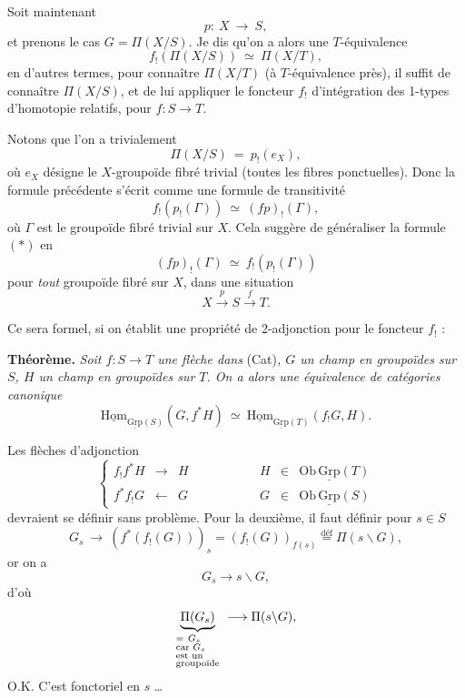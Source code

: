 \documentclass[11pt]{article}
\newcommand{\printedpage}[1]{\marginpar{\footnotesize p.~#1}}
\newcommand{\msp}[1]{\marginpar{\footnotesize [#1]}}
\newcommand{\uHom}{\underline{\mathrm{Hom}}}
\newcommand{\uGrp}{\underline{\mathrm{Grp}}}
\newcommand{\fl}{\longrightarrow}
\begin{document}
Soit maintenant
\[ p :\ X \ \longrightarrow\ S, \]
et prenons le cas $G = \Pi(X/S)$. Je dis qu'on a alors une $T$-équivalence
\[ \boxed{\ f_!(\Pi(X/S)) \ \simeq\ \Pi(X/T),\ } \tag*{$(*)$} \]
en d'autres termes, pour connaître $\Pi(X/T)$ (à $T$-équivalence près), il suffit de connaître $\Pi(X/S)$, et de lui appliquer le foncteur $f_!$ d'intégration des 1-types d'homotopie relatifs, pour $f : S \longrightarrow T$.

Notons que l'on a trivialement
\[ \Pi(X/S) \ =\ p_!(e_X), \]
où $e_X$ désigne le $X$-groupoïde fibré trivial (toutes les fibres ponctuelles). Donc la formule précédente s'écrit comme une formule de transitivité
\[ f_!(p_!(\Gamma)) \ \simeq\ (fp)_!(\Gamma), \]
\msp{page 4}
où $\Gamma$ est le groupoïde fibré trivial sur $X$. Cela suggère de généraliser la formule $(*)$ en
\[ \boxed{\ (fp)_!(\Gamma) \ \simeq\ f_!(p_!(\Gamma))\ } \]
pour \textit{tout} groupoïde fibré sur $X$, dans une situation
\[ X \xrightarrow{\ p\ } S \xrightarrow{\ f\ } T. \]

Ce sera formel, si on établit une propriété de 2-adjonction pour le foncteur $f_!$ :

\printedpage{4}

\textbf{Théorème.} \textit{Soit $f : S \fl T$ une flèche dans} (Cat)\textit{, $G$ un champ en groupoïdes sur $S$, $H$ un champ en groupoïdes sur $T$. On a alors une équivalence de catégories canonique}
\[
\boxed{\ \uHom_{\uGrp(S)}(G, f^*H) \ \simeq\ \uHom_{\uGrp(T)}(f_!G, H).\ }
\]

Les flèches d'adjonction
\[
\left\{
\begin{array}{lclcrcl}
f_!f^*H & \fl & H & \qquad\qquad & H & \in & \mathrm{Ob}\,\uGrp(T)\\[4pt]
f^*f_!G & \longleftarrow & G & \qquad\qquad & G & \in & \mathrm{Ob}\,\uGrp(S)
\end{array}
\right.
\]
devraient se définir sans problème. Pour la deuxième, il faut définir pour $s \in S$
\[
G_s \ \fl\ (f^*(f_!(G)))_s = (f_!(G))_{f(s)} \overset{\text{déf}}{=} \Pi(s\backslash G),
\]
or on a
\[
G_s \fl s\backslash G,
\]
d'où
\[
\underbrace{\Pi(G_s)}_{\begin{subarray}{l} =\ G_s\\ \text{car } G_s\\ \text{est un}\\ \text{groupoïde}\end{subarray}} \ \fl \Pi(s\backslash G),
\]
O.K. C'est fonctoriel en $s$ \dots
\end{document}
